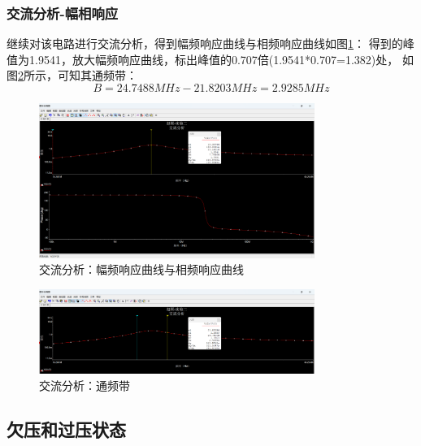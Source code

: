\documentclass[UTF8]{ctexart}
\begin{document}
\subsubsection{交流分析-幅相响应}
继续对该电路进行交流分析，得到幅频响应曲线与相频响应曲线如图\ref{img:7}：
得到的峰值为1.9541，放大幅频响应曲线，标出峰值的0.707倍(1.9541*0.707=1.382)处，
如图\ref{img:8}所示，可知其通频带：
$$
B=24.7488MHz-21.8203MHz=2.9285MHz
$$
\begin{figure}[htbp]
    \centering
    \includegraphics[width=0.8\textwidth]{7.png}
    \caption{交流分析：幅频响应曲线与相频响应曲线}
    \label{img:7}
\end{figure}
\begin{figure}[htbp]
    \centering
    \includegraphics[width=0.8\textwidth]{8.png}
    \caption{交流分析：通频带}
    \label{img:8}
\end{figure}
\subsection{欠压和过压状态}
\end{document}
